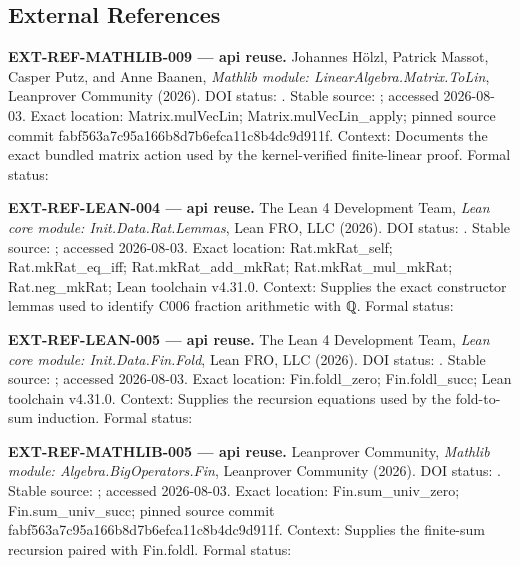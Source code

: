 \subsection{External References}\label{external-references}

\textbf{EXT-REF-MATHLIB-009 --- api reuse.} Johannes Hölzl, Patrick
Massot, Casper Putz, and Anne Baanen, \emph{Mathlib module:
LinearAlgebra.Matrix.ToLin}, Leanprover Community (2026). DOI status:
\texttt{\protect{}}. Stable source:
\texttt{\protect{}};
accessed 2026-08-03. Exact location: Matrix.mulVecLin;
Matrix.mulVecLin\_apply; pinned source commit
fabf563a7c95a166b8d7b6efca11c8b4dc9d911f. Context: Documents the exact
bundled matrix action used by the kernel-verified finite-linear proof.
Formal status:
\texttt{\protect{}}

\textbf{EXT-REF-LEAN-004 --- api reuse.} The Lean 4 Development Team,
\emph{Lean core module: Init.Data.Rat.Lemmas}, Lean FRO, LLC (2026). DOI
status: \texttt{\protect{}}. Stable source:
\texttt{\protect{}};
accessed 2026-08-03. Exact location: Rat.mkRat\_self;
Rat.mkRat\_eq\_iff; Rat.mkRat\_add\_mkRat; Rat.mkRat\_mul\_mkRat;
Rat.neg\_mkRat; Lean toolchain v4.31.0. Context: Supplies the exact
constructor lemmas used to identify C006 fraction arithmetic with ℚ.
Formal status: \texttt{\protect{}}

\textbf{EXT-REF-LEAN-005 --- api reuse.} The Lean 4 Development Team,
\emph{Lean core module: Init.Data.Fin.Fold}, Lean FRO, LLC (2026). DOI
status: \texttt{\protect{}}. Stable source:
\texttt{\protect{}};
accessed 2026-08-03. Exact location: Fin.foldl\_zero; Fin.foldl\_succ;
Lean toolchain v4.31.0. Context: Supplies the recursion equations used
by the fold-to-sum induction. Formal status:
\texttt{\protect{}}

\textbf{EXT-REF-MATHLIB-005 --- api reuse.} Leanprover Community,
\emph{Mathlib module: Algebra.BigOperators.Fin}, Leanprover Community
(2026). DOI status: \texttt{\protect{}}. Stable
source:
\texttt{\protect{}};
accessed 2026-08-03. Exact location: Fin.sum\_univ\_zero;
Fin.sum\_univ\_succ; pinned source commit
fabf563a7c95a166b8d7b6efca11c8b4dc9d911f. Context: Supplies the
finite-sum recursion paired with Fin.foldl. Formal status:
\texttt{\protect{}}

